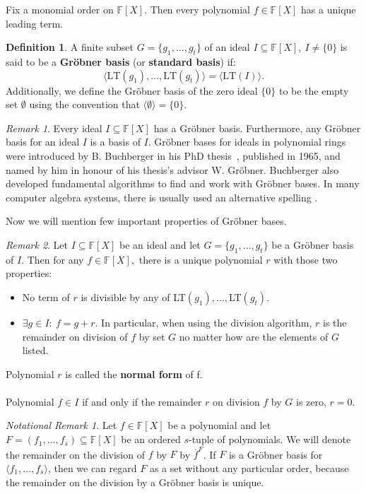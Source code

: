 \documentclass[thesis=M,english]{FITthesis}[2012/10/20]
\theoremstyle{remark}
\newtheorem*{RM}{Remark}
\newtheorem*{NRM}{Notational Remark}
\theoremstyle{definition}
\newtheorem{DF}{Definition}[section]
\begin{document}
\noindent Fix a monomial order on $\mathbb{F}[X]$. Then every polynomial $f \in \mathbb{F}[X]$ has a unique leading term.
\begin{DF} A finite subset $G = \{g_1, \ldots, g_t \}$ of an ideal $I \subseteq \mathbb{F}[X],\ I \neq \{ 0 \}$ is said to be a \textbf{Gröbner basis} (or \textbf{standard basis}) if:
$$
\langle \text{LT}(g_1), \ldots, \text{LT}(g_t) \rangle = \langle \text{LT}(I) \rangle.
$$
Additionally, we define the Gröbner basis of the zero ideal $\{0\}$ to be the empty set $\emptyset$ using the convention that $\langle \emptyset \rangle = \{0\}.$
\end{DF}
\begin{RM}
Every ideal $I \subseteq \mathbb{F}[X]$ has a Gröbner basis. Furthermore, any Gröbner basis for an ideal $I$ is a basis of $I$. Gröbner bases for ideals in polynomial rings were introduced by B. Buchberger in his PhD thesis~\cite{bruno}, published in 1965, and named by him in honour of his thesis's advisor W. Gröbner. Buchberger also developed fundamental algorithms to find and work with Gröbner bases. In many computer algebra systems, there is usually used an alternative spelling .
\end{RM}
\phantom{.}
\phantom{.}
\noindent Now we will mention few important properties of Gröbner bases.
\begin{RM}
Let $I \subseteq \mathbb{F}[X]$ be an ideal and let $G = \{g_1, \ldots, g_t\}$ be a Gröbner basis of $I$. Then for any $f \in \mathbb{F}[X],$ there is a unique polynomial $r$ with those two properties:
\begin{itemize}
\item No term of $r$ is divisible by any of LT$(g_1),\ldots,$LT$(g_t)$.
\item $\exists g \in I:\ f = g + r.$
In particular, when using the division algorithm, $r$ is the remainder on division of $f$ by set $G$ no matter how are the elements of $G$ listed.
\end{itemize}
Polynomial $r$ is called the \textbf{normal form} of f. \\ \\ 
\noindent Polynomial $f \in I$ if and only if the remainder $r$ on division $f$ by $G$ is zero, $r = 0.$
\end{RM}
\begin{NRM}
Let $f \in \mathbb{F}[X]$ be a polynomial and let $F = (f_1, \ldots, f_s) \subseteq \mathbb{F}[X]$ be an ordered $s$-tuple of polynomials. We will denote the remainder on the division of $f$ by $F$ by $\overline{f}^F$. If $F$ is a Gröbner basis for $\langle f_1, \ldots, f_s \rangle$, then we can regard $F$ as a set without any particular order, because the remainder on the division by a Gröbner basis is unique.
\end{NRM}
\end{document}
